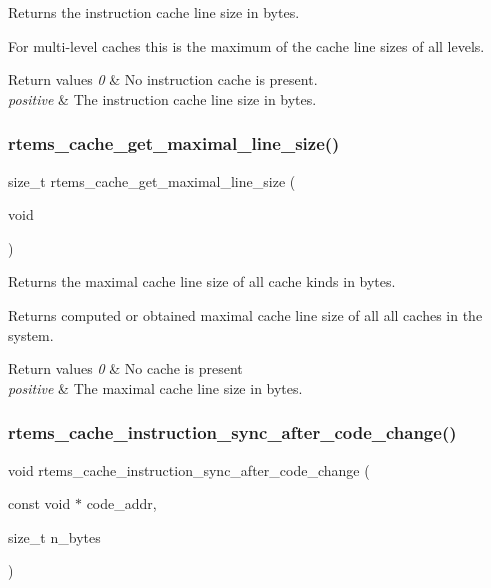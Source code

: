 Returns the instruction cache line size in bytes. 

For multi-\/level caches this is the maximum of the cache line sizes of all levels.


\begin{DoxyRetVals}{Return values}
{\em 0} & No instruction cache is present. \\
\hline
{\em positive} & The instruction cache line size in bytes. \\
\hline
\end{DoxyRetVals}
\mbox{\label{group__ClassicCache_ga1083d01ae20fb51f2b65b2319c1831d6}} 
\subsubsection{\texorpdfstring{rtems\_cache\_get\_maximal\_line\_size()}{rtems\_cache\_get\_maximal\_line\_size()}}
{\footnotesize\ttfamily size\+\_\+t rtems\+\_\+cache\+\_\+get\+\_\+maximal\+\_\+line\+\_\+size (\begin{DoxyParamCaption}\item[{void}]{ }\end{DoxyParamCaption})}



Returns the maximal cache line size of all cache kinds in bytes. 

Returns computed or obtained maximal cache line size of all all caches in the system.


\begin{DoxyRetVals}{Return values}
{\em 0} & No cache is present \\
\hline
{\em positive} & The maximal cache line size in bytes. \\
\hline
\end{DoxyRetVals}
\mbox{\label{group__ClassicCache_ga5e231667c6314e520fe3d77d64f260ee}} 
\subsubsection{\texorpdfstring{rtems\_cache\_instruction\_sync\_after\_code\_change()}{rtems\_cache\_instruction\_sync\_after\_code\_change()}}
{\footnotesize\ttfamily void rtems\+\_\+cache\+\_\+instruction\+\_\+sync\+\_\+after\+\_\+code\+\_\+change (\begin{DoxyParamCaption}\item[{const void $\ast$}]{code\+\_\+addr,  }\item[{size\+\_\+t}]{n\+\_\+bytes }\end{DoxyParamCaption})}



